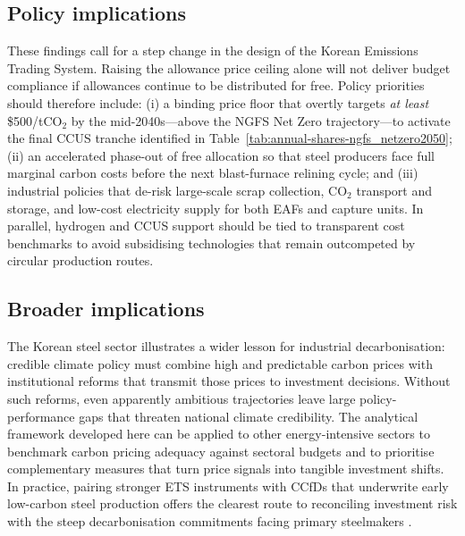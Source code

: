 \documentclass[preprint,1p,authoryear]{elsarticle}
\begin{document}
\subsection{Policy implications}

These findings call for a step change in the design of the Korean Emissions Trading System. Raising the allowance price ceiling alone will not deliver budget compliance if allowances continue to be distributed for free. Policy priorities should therefore include: (i) a binding price floor that overtly targets \emph{at least} \$500/tCO$_2$ by the mid-2040s—above the NGFS Net Zero trajectory—to activate the final CCUS tranche identified in Table~\ref{tab:annual-shares-ngfs_netzero2050}; (ii) an accelerated phase-out of free allocation so that steel producers face full marginal carbon costs before the next blast-furnace relining cycle; and (iii) industrial policies that de-risk large-scale scrap collection, CO$_2$ transport and storage, and low-cost electricity supply for both EAFs and capture units. In parallel, hydrogen and CCUS support should be tied to transparent cost benchmarks to avoid subsidising technologies that remain outcompeted by circular production routes.

\subsection{Broader implications}

The Korean steel sector illustrates a wider lesson for industrial decarbonisation: credible climate policy must combine high and predictable carbon prices with institutional reforms that transmit those prices to investment decisions. Without such reforms, even apparently ambitious trajectories leave large policy-performance gaps that threaten national climate credibility. The analytical framework developed here can be applied to other energy-intensive sectors to benchmark carbon pricing adequacy against sectoral budgets and to prioritise complementary measures that turn price signals into tangible investment shifts. In practice, pairing stronger ETS instruments with CCfDs that underwrite early low-carbon steel production offers the clearest route to reconciling investment risk with the steep decarbonisation commitments facing primary steelmakers \citep{Neuhoff2019CCfD}.






\end{document}
